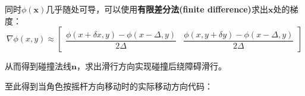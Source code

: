 同时\(\phi(\mathbf{x})\)几乎随处可导，可以使用\textbf{有限差分法(finite
difference)}求出\(\mathbf{x}\)处的梯度： \[
\nabla \phi(x,y)\approx
\begin{bmatrix}
\dfrac{\phi(x +\delta x, y)-\phi(x -\Delta, y)}{2\Delta} &
\dfrac{\phi(x, y +\delta y)-\phi(x -\Delta, y)}{2\Delta}
\end{bmatrix}
\]

从而得到碰撞法线\(\mathbf{n}\)，求出滑行方向实现碰撞后绕障碍滑行。

\begin{Shaded}
\begin{Highlighting}[]
     \NormalTok{ * } \NormalTok{(}
        \NormalTok{(} \NormalTok{)) - }
        \NormalTok{(} \NormalTok{)),}
        \NormalTok{(} 
        \NormalTok{(} 
\NormalTok{\}}
\end{Highlighting}
\end{Shaded}

至此得到当角色按摇杆方向移动时的实际移动方向代码：


